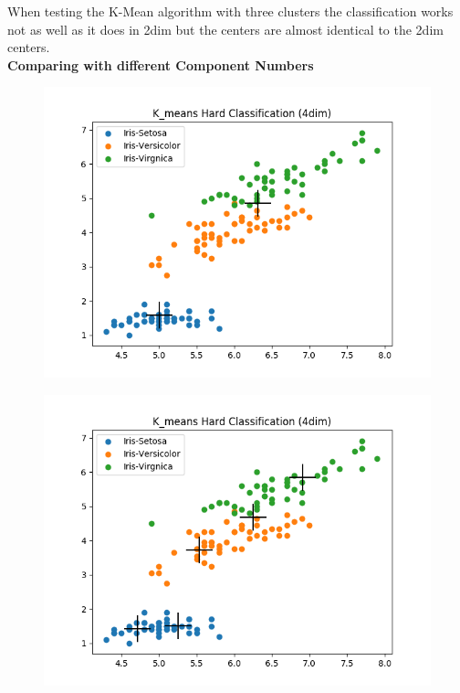 \documentclass[a4paper]{article}
\begin{document}
\noindent
When testing the K-Mean algorithm with three clusters the classification works not as well as it does in 2dim but the centers are almost identical to the 2dim centers.\\

\newpage
{\large \textbf{Comparing with different Component Numbers}} \\


\begin{figure}[htp]
\centering
\begin{minipage}{0.4\textwidth}
  \includegraphics[scale=0.5]{plots/kmeans_sc2_c2.png}
  \label{fig:16}
\end{minipage}
\hfill
\begin{minipage}{0.4\textwidth}
  \includegraphics[scale=0.5]{plots/kmeans_sc2_c5.png}
  \label{fig:17}
\end{minipage}
\end{figure}
\end{document}
